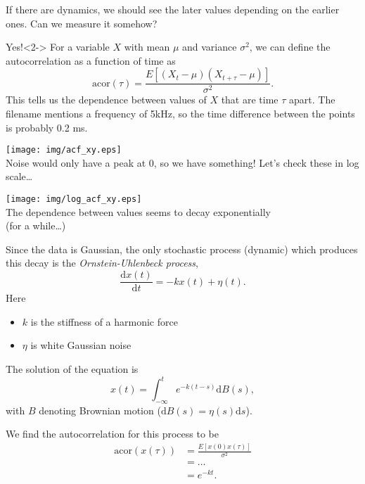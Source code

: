 \documentclass{beamer}
\begin{document}
\begin{frame}
If there are dynamics, we should see the later values depending on the earlier ones. Can we measure it somehow?

\begin{block}{Yes!}<2->
For a variable $X$ with mean $\mu$ and variance $\sigma^2$, we can define the autocorrelation as a function of time as
\[
 \mathrm{acor}(\tau) = \frac{E[(X_t - \mu)(X_{t+\tau} - \mu)]}{\sigma^2}.
\]
This tells us the dependence between values of $X$ that are time $\tau$ apart. The filename mentions a frequency of 5kHz, so the time difference between the points is probably 0.2 ms.
\end{block}

\end{frame}

\begin{frame}
\centering
\texttt{[image: img/acf\_xy.eps]}\\

Noise would only have a peak at 0, so we have something! Let's check these in log scale\dots
\end{frame}

\begin{frame}
\centering
\texttt{[image: img/log\_acf\_xy.eps]}\\

The dependence between values seems to decay exponentially\\ (for a while\dots)
\end{frame}

\begin{frame}
Since the data is Gaussian, the only stochastic process (dynamic) which produces this decay is the \emph{Ornstein-Uhlenbeck process},
\[
 \frac{\mathrm dx(t)}{\mathrm dt} = - k x(t) + \eta(t).
\]
Here
\begin{itemize}
 \item $k$ is the stiffness of a harmonic force
 \item $\eta$ is white Gaussian noise
\end{itemize}
\end{frame}

\begin{frame}
The solution of the equation is
\[
 x(t) = \int_{-\infty}^t e^{-k (t-s)}\mathrm dB(s),
\]
with $B$ denoting Brownian motion ($\mathrm dB(s) = \eta(s)\mathrm ds$).

We find the autocorrelation for this process to be
\begin{align*}
 \mathrm{acor}(x(\tau)) &= \frac{E[x(0)x(\tau)]}{\sigma^2} \\
  &=\dots \\
  &= e^{-kt}.
\end{align*}

\end{frame}
\end{document}
